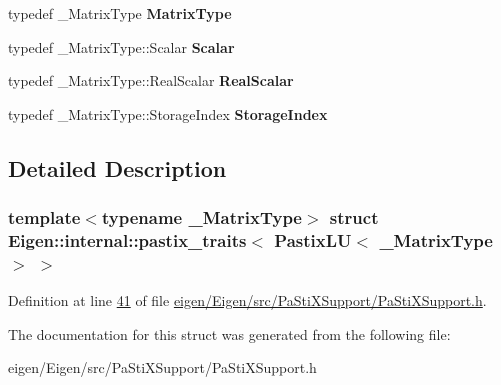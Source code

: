 \begin{DoxyCompactItemize}
typedef \+\_\+\+Matrix\+Type {\bfseries Matrix\+Type}
\item 
\mbox{\label{struct_eigen_1_1internal_1_1pastix__traits_3_01_pastix_l_u_3_01___matrix_type_01_4_01_4_a9a3a36d1582355961fc61b56accce68b}} 
typedef \+\_\+\+Matrix\+Type\+::\+Scalar {\bfseries Scalar}
\item 
\mbox{\label{struct_eigen_1_1internal_1_1pastix__traits_3_01_pastix_l_u_3_01___matrix_type_01_4_01_4_ab730372ff0f43dc2af281a4513832735}} 
typedef \+\_\+\+Matrix\+Type\+::\+Real\+Scalar {\bfseries Real\+Scalar}
\item 
\mbox{\label{struct_eigen_1_1internal_1_1pastix__traits_3_01_pastix_l_u_3_01___matrix_type_01_4_01_4_a18b75c7eedd17fd2ceb4011394ef650b}} 
typedef \+\_\+\+Matrix\+Type\+::\+Storage\+Index {\bfseries Storage\+Index}
\end{DoxyCompactItemize}


\subsection{Detailed Description}
\subsubsection*{template$<$typename \+\_\+\+Matrix\+Type$>$\newline
struct Eigen\+::internal\+::pastix\+\_\+traits$<$ Pastix\+L\+U$<$ \+\_\+\+Matrix\+Type $>$ $>$}



Definition at line \hyperlink{eigen_2_eigen_2src_2_pa_sti_x_support_2_pa_sti_x_support_8h_source_l00041}{41} of file \hyperlink{eigen_2_eigen_2src_2_pa_sti_x_support_2_pa_sti_x_support_8h_source}{eigen/\+Eigen/src/\+Pa\+Sti\+X\+Support/\+Pa\+Sti\+X\+Support.\+h}.



The documentation for this struct was generated from the following file\+:\begin{DoxyCompactItemize}
\item 
eigen/\+Eigen/src/\+Pa\+Sti\+X\+Support/\+Pa\+Sti\+X\+Support.\+h\end{DoxyCompactItemize}
